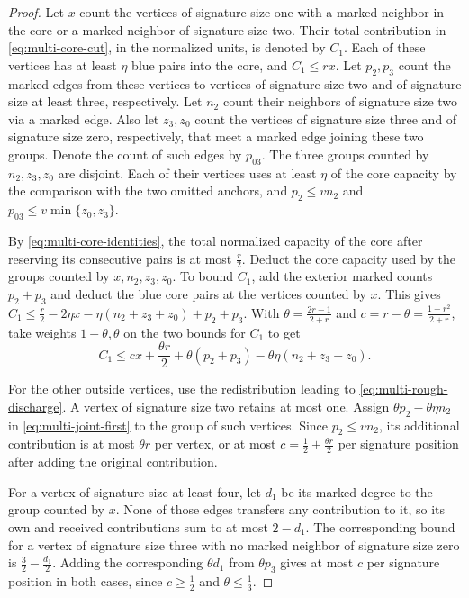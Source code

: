 \documentclass[preprint,11pt,numbers]{elsarticle-arxiv}
\numberwithin{equation}{section}
\theoremstyle{definition}
\begin{document}
\begin{proof}
Let $x$ count the vertices of signature size one with a marked
neighbor in the core or a marked neighbor of signature size two.
Their total contribution in \eqref{eq:multi-core-cut}, in the
normalized units, is denoted by $C_1$. Each of these vertices has
at least $\eta$ blue pairs into the core, and $C_1\le rx$. Let
$p_2,p_3$ count the marked edges from these vertices to vertices of
signature size two and of signature size at least three, respectively.
Let $n_2$ count their neighbors of signature size two via a marked
edge. Also let $z_3,z_0$ count the vertices of signature size three
and of signature size zero, respectively, that meet a marked edge
joining these two groups. Denote the count of such edges by $p_{03}$.
The three groups counted by $n_2,z_3,z_0$ are disjoint. Each of their
vertices uses at least $\eta$ of the core capacity by the comparison
with the two omitted anchors, and $p_2\le v n_2$ and
$p_{03}\le v\min\{z_0,z_3\}$.

By \eqref{eq:multi-core-identities}, the total normalized capacity
of the core after reserving its consecutive pairs is at most
$\frac{r}{2}$. Deduct the core capacity used by the groups counted
by $x,n_2,z_3,z_0$. To bound $C_1$, add the exterior marked
counts $p_2+p_3$ and deduct the blue core pairs at the vertices
counted by $x$. This gives
$C_1\le\frac{r}{2}-2\eta x-\eta(n_2+z_3+z_0)+p_2+p_3$.
With $\theta=\frac{2r-1}{2+r}$ and $c=r-\theta=\frac{1+r^2}{2+r}$,
take weights $1-\theta,\theta$ on the two bounds for $C_1$ to get
\begin{equation}\label{eq:multi-joint-first}
 C_1\le cx+\frac{\theta r}{2}
     +\theta(p_2+p_3)-\theta\eta(n_2+z_3+z_0).
\end{equation}

For the other outside vertices, use the redistribution leading to
\eqref{eq:multi-rough-discharge}. A vertex of signature size two
retains at most one. Assign $\theta p_2-\theta\eta n_2$ in
\eqref{eq:multi-joint-first} to the group of such vertices. Since
$p_2\le v n_2$, its additional contribution is at most $\theta r$
per vertex, or at most $c=\frac{1}{2}+\frac{\theta r}{2}$ per signature
position after adding the original contribution.

For a vertex of signature size at least four, let $d_1$ be its
marked degree to the group counted by $x$. None of those edges
transfers any contribution to it, so its own and received
contributions sum to at most $2-d_1$. The corresponding bound for a
vertex of signature size three with no marked neighbor of signature
size zero is $\frac{3}{2}-\frac{d_1}{2}$. Adding the corresponding
$\theta d_1$ from $\theta p_3$ gives at most $c$ per signature
position in both cases, since $c\ge\frac{1}{2}$ and $\theta\le\frac{1}{3}$.


\end{proof}
\end{document}
